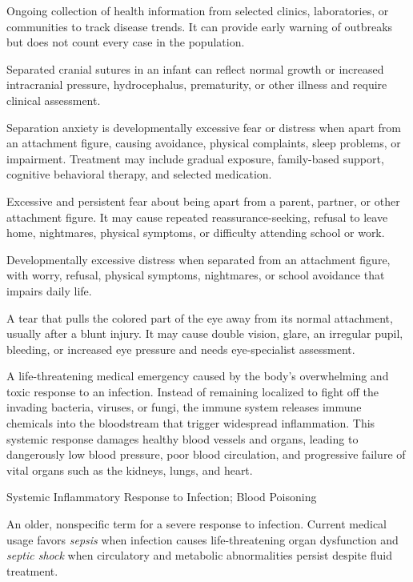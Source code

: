  Ongoing collection of health information from selected clinics, laboratories, or communities to track disease trends. It can provide early warning of outbreaks but does not count every case in the population.

 Separated cranial sutures in an infant can reflect normal growth or increased intracranial pressure, hydrocephalus, prematurity, or other illness and require clinical assessment.

 Separation anxiety is developmentally excessive fear or distress when apart from an attachment figure, causing avoidance, physical complaints, sleep problems, or impairment. Treatment may include gradual exposure, family-based support, cognitive behavioral therapy, and selected medication.

 Excessive and persistent fear about being apart from a parent, partner, or other attachment figure. It may cause repeated reassurance-seeking, refusal to leave home, nightmares, physical symptoms, or difficulty attending school or work.

 Developmentally excessive distress when separated from an attachment figure, with worry, refusal, physical symptoms, nightmares, or school avoidance that impairs daily life.

 A tear that pulls the colored part of the eye away from its normal attachment, usually after a blunt injury. It may cause double vision, glare, an irregular pupil, bleeding, or increased eye pressure and needs eye-specialist assessment.

 A life-threatening medical emergency caused by the body's overwhelming and toxic response to an infection. Instead of remaining localized to fight off the invading bacteria, viruses, or fungi, the immune system releases immune chemicals into the bloodstream that trigger widespread inflammation. This systemic response damages healthy blood vessels and organs, leading to dangerously low blood pressure, poor blood circulation, and progressive failure of vital organs such as the kidneys, lungs, and heart.

\synonyms
Systemic Inflammatory Response to Infection; Blood Poisoning

 An older, nonspecific term for a severe response to infection. Current medical usage favors \textit{sepsis} when infection causes life-threatening organ dysfunction and \textit{septic shock} when circulatory and metabolic abnormalities persist despite fluid treatment.

